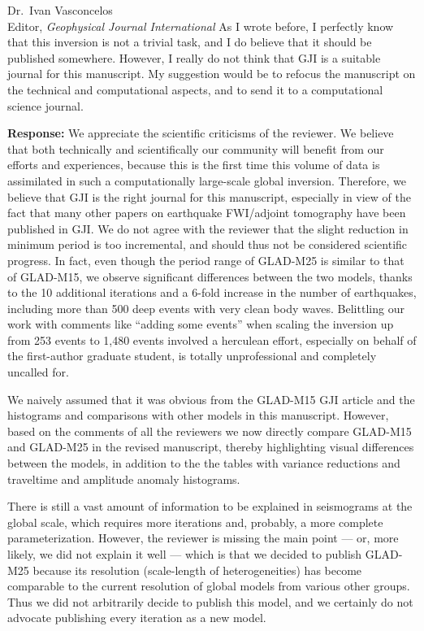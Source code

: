 \documentclass[11pt,a4paper]{letter}
\newcommand{\response}[1]{\textbf{Response:} #1}
\begin{document}
\begin{letter}{Dr.~Ivan Vasconcelos\\
Editor, \textit{Geophysical Journal International}}
{As I wrote before, I perfectly know that this inversion is not a trivial task, and I do believe that it should be published somewhere. However, I really do not think that GJI is a suitable journal for this manuscript. My suggestion would be to refocus the manuscript on the technical and computational aspects, and to send it to a computational science journal.
}

\response{We appreciate the scientific criticisms of the reviewer.
We believe that both technically and scientifically our community will benefit from our efforts and experiences, because this is the first time this volume of data is
assimilated in such a computationally large-scale global inversion.
Therefore,
we believe that GJI is the right journal for this manuscript,
especially in view of the fact that many other papers on earthquake FWI/adjoint tomography have been published in GJI.
We do not agree with the reviewer that the slight reduction in minimum period is too incremental, and should thus not be considered scientific progress.
In fact, even though the period range of GLAD-M25 is similar to that of GLAD-M15,
we observe significant differences between the two models,
thanks to the 10 additional iterations and a 6-fold increase in the number of earthquakes,
including more than 500 deep events with very clean body waves.
Belittling our work with comments like ``adding some events'' when scaling the inversion up from 253 events to 1,480 events involved a herculean effort, especially on behalf of the first-author graduate student, is totally unprofessional and completely uncalled for.

We naively assumed that it was obvious from the GLAD-M15 GJI article and the histograms and comparisons with other models in this manuscript.
However, based on the comments of all the reviewers we now directly compare GLAD-M15 and GLAD-M25 in the revised manuscript,
thereby highlighting visual differences between the models, in addition to the the tables with variance reductions and traveltime and amplitude anomaly histograms.

There is still a vast amount of information to be explained in seismograms at the global scale, which requires more iterations and, probably, a more complete parameterization.
However, the reviewer is missing the main point --- or, more likely, we did not explain it well --- which is that we decided to publish GLAD-M25 because its resolution (scale-length of heterogeneities) has become comparable to the current resolution of global models from various other groups.
Thus we did not arbitrarily decide to publish this model,
and we certainly do not advocate publishing every iteration as a new model.

}
\end{letter}
\end{document}
